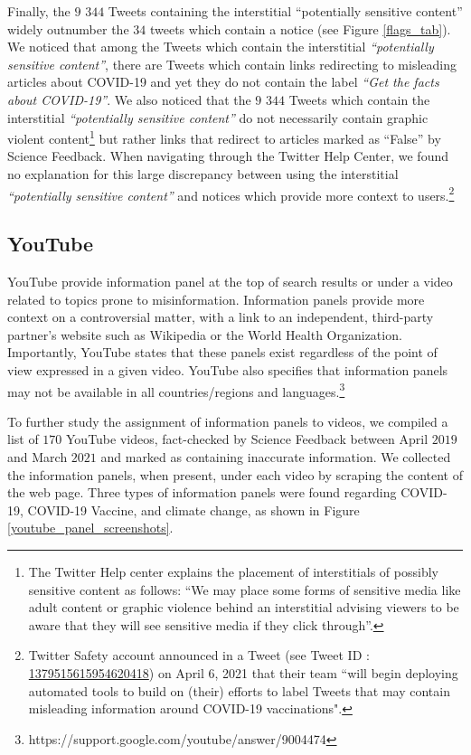 \documentclass{article}
\begin{document}
\smallskip

Finally, the $9$ $344$ Tweets containing the interstitial ``potentially sensitive content'' widely outnumber the $34$ tweets which contain a notice (see Figure \ref{flags_tab}). We noticed that among the Tweets which contain the interstitial {\it ``potentially sensitive content''}, there are Tweets which contain links redirecting to misleading articles about COVID-19 and yet they do not contain the label { \it ``Get the facts about COVID-19''}. We also noticed that the $9$ $344$ Tweets which contain the interstitial {\it ``potentially sensitive content''} do not necessarily contain graphic violent content\footnote{The Twitter Help center explains the placement of interstitials of possibly sensitive content as follows: ``We may place some forms of sensitive media like adult content or graphic violence behind an interstitial advising viewers to be aware that they will see sensitive media if they click through''.} but rather links that redirect to articles marked as ``False'' by Science Feedback. When navigating through the Twitter Help Center, we found no explanation for this large discrepancy between using the interstitial {\it ``potentially sensitive content''} and notices which provide more context to users.\footnote{Twitter Safety account announced in a Tweet (see Tweet ID : \href{https://twitter.com/TwitterSafety/status/1379515615954620418}{1379515615954620418}) on April 6, 2021 that their team ``will begin deploying automated tools to build on (their) efforts to label Tweets that may contain misleading information around COVID-19 vaccinations".}  

\subsection{YouTube} \label{youtube_panels}

YouTube provide information panel at the top of search results or under a video related to topics prone to misinformation.
Information panels provide more context on a controversial matter, with a link to an independent, third-party partner's website such as Wikipedia or the World Health Organization. 
Importantly, YouTube states that these panels exist regardless of the point of view expressed in a given video.
YouTube also specifies that information panels may not be available in all countries/regions and languages.\footnote{https://support.google.com/youtube/answer/9004474}

\smallskip

To further study the assignment of information panels to videos, we compiled a list of $170$ YouTube videos, fact-checked by Science Feedback between April $2019$ and March $2021$ and marked as containing inaccurate information. 
We collected the information panels, when present, under each video by scraping the content of the web page. 
Three types of information panels were found regarding COVID-19, COVID-19 Vaccine, and climate change, as shown in Figure \ref{youtube_panel_screenshots}.
\end{document}
